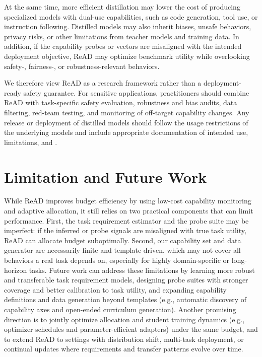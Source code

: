 At the same time, more efficient distillation may lower the cost of producing
specialized models with dual-use capabilities, such as code generation, tool use,
or instruction following. Distilled models may also inherit biases, unsafe
behaviors, privacy risks, or other limitations from teacher models and training
data. In addition, if the capability probes or  vectors are
misaligned with the intended deployment objective, ReAD may optimize benchmark
utility while overlooking safety-, fairness-, or robustness-relevant behaviors.

We therefore view ReAD as a research framework rather than a deployment-ready
safety guarantee. For sensitive applications, practitioners should combine ReAD
with task-specific safety evaluation, robustness and bias audits, data filtering,
red-team testing, and monitoring of off-target capability changes. Any release
or deployment of distilled models should follow the usage restrictions of the
underlying models and include appropriate documentation of intended use,
limitations, and .

\FloatBarrier
\section{Limitation and Future Work}

While ReAD improves budget efficiency by using low-cost capability monitoring and adaptive allocation, it still relies on two practical components that can limit performance. First, the task requirement estimator and the probe suite may be imperfect: if the inferred  or probe signals are misaligned with true task utility, ReAD can allocate budget suboptimally.  Second, our capability set and data generator are necessarily finite and template-driven, which may not cover all behaviors a real task depends on, especially for highly domain-specific or long-horizon tasks. Future work can address these limitations by learning more robust and transferable task requirement models, designing probe suites with stronger coverage and better calibration to task utility, and expanding capability definitions and data generation beyond templates (e.g., automatic discovery of capability axes and open-ended curriculum generation). Another promising direction is to jointly optimize allocation and student training dynamics (e.g., optimizer schedules and parameter-efficient adapters) under the same budget, and to extend ReAD to settings with distribution shift, multi-task deployment, or continual updates where requirements and transfer patterns evolve over time.